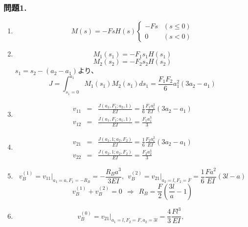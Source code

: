 \documentclass[10pt,a4j]{jarticle}
\begin{document}
\subsubsection*{問題1.}
\begin{enumerate}
\item
	\begin{equation}
	M(s)=-FsH(s)\left\{
		\begin{array}{cc}
			-Fs & (s\leq 0) \\
			0 & (s<0)
		\end{array}
	\right.
	\label{eqn:}
	\end{equation}
\item
	\begin{equation}
		M_1(s_1)= -F_1s_1H(s_1)
	\end{equation}
	\begin{equation}
		M_2(s_2)= -F_2s_2H(s_2)
	\end{equation}
	$s_1=s_2-(a_2-a_1)$より、
	\begin{equation}
		J=\int_{s_1=0}^{a_1} M_1(s_1)M_2(s_1)ds_1=\frac{F_1F_2}{6}a_1^2(3a_2-a_1)
		\label{eqn:}
	\end{equation}
\item
	\begin{eqnarray}
		v_{11}&=& \frac{J(a_1,F_1;a_2,1)}{EI}=\frac{1}{6}\frac{F_1a_1^2}{EI}(3a_2-a_1) \\
		v_{12}&=& \frac{J(a_1,F_1;a_1,1)}{EI}=\frac{F_1a_1^3}{3} 
	\end{eqnarray}
\item
	\begin{eqnarray}
		v_{21}&=& \frac{J(a_1,1;a_2,F_2)}{EI}=\frac{1}{6}\frac{F_2a_1^2}{EI}(3a_2-a_1) \\
		v_{22}&=& \frac{J(a_2,1;a_2,F_2)}{EI}=\frac{F_2a_2^3}{3} 
	\end{eqnarray}
\item
	\begin{equation}
		v_B^{(1)}=\left. v_{11}\right|_{a_1=a, F_1=-R_B}= -\frac{R_Ba^3}{3EI}, \ \ 
		v_B^{(2)}=\left. v_{21}\right|_{a_2=l, F_2=F}= \frac{1}{6}\frac{Fa^2}{EI}(3l-a)
		\label{eqn:}
	\end{equation}
	\begin{equation}
		v_B^{(1)}+v_B^{(2)}=0 \ \ \Rightarrow \ \ 
		R_B=\frac{F}{2}\left(\frac{3l}{a}-1\right)
		\label{eqn:}
	\end{equation}
\item
	\begin{equation}
		v_B^{(0)}=\left. v_{21}\right|_{a_1=l, F_2=F,a_2=3l}= \frac{4}{3}\frac{Fl^3}{EI}, \ \ 

\end{equation}
\end{enumerate}
\end{document}
